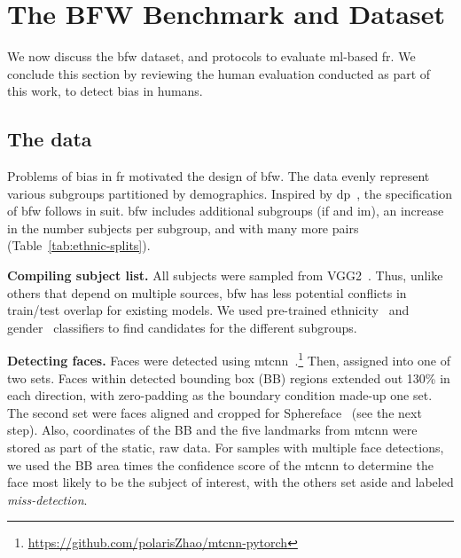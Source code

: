 \section{The BFW Benchmark and Dataset}


We now discuss the \gls{bfw} dataset, and protocols to evaluate \gls{ml}-based \gls{fr}. We  conclude this section by reviewing the human evaluation conducted as part of this work, to detect bias in humans.

\subsection{The data}
Problems of bias in \gls{fr} motivated the design of \gls{bfw}. The data evenly represent various subgroups partitioned by demographics. Inspired by \gls{dp}~\cite{demogPairs}, the specification of \gls{bfw} follows in suit. \gls{bfw} includes additional subgroups (\ie \gls{if} and \gls{im}), an increase in the number subjects per subgroup, and with many more pairs (Table~\ref{tab:ethnic-splits}). 




\vspace{1mm}
\noindent\textbf{Compiling subject list.} 
 All subjects were sampled from VGG2~\cite{Cao18}. Thus, unlike others that depend on multiple sources, \gls{bfw} has less potential conflicts in train/test overlap for existing models. We used pre-trained ethnicity~\cite{ambekar2009name} and gender~\cite{levi2015age} classifiers to find candidates for the different subgroups.



\vspace{1mm}
\noindent\textbf{Detecting faces.} Faces were detected using \gls{mtcnn}~\cite{zhang2016joint}.\footnote{\href{https://github.com/polarisZhao/mtcnn-pytorch}{https://github.com/polarisZhao/mtcnn-pytorch}} Then, assigned into one of two sets. Faces within detected bounding box (BB) regions extended out 130\% in each direction, with zero-padding as the boundary condition made-up one set. The second set were faces aligned and cropped for Sphereface~\cite{liu2017sphereface} (see the next step). Also, coordinates of the BB and the five landmarks from \gls{mtcnn} were stored as part of the static, raw data. For samples with multiple face detections, we used the BB area times the confidence score of the \gls{mtcnn} to determine the face most likely to be the subject of interest, with the others set aside and labeled \textit{miss-detection}. 

